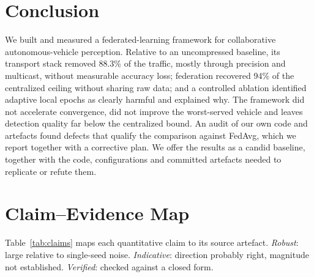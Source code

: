 \documentclass[journal]{IEEEtran}
\begin{document}
\section{Conclusion}\label{sec:conclusion}
We built and measured a federated-learning framework for collaborative autonomous-vehicle perception. Relative to an uncompressed baseline, its transport stack removed 88.3\% of the traffic, mostly through precision and multicast, without measurable accuracy loss; federation recovered 94\% of the centralized ceiling without sharing raw data; and a controlled ablation identified adaptive local epochs as clearly harmful and explained why. The framework did not accelerate convergence, did not improve the worst-served vehicle and leaves detection quality far below the centralized bound. An audit of our own code and artefacts found defects that qualify the comparison against FedAvg, which we report together with a corrective plan. We offer the results as a candid baseline, together with the code, configurations and committed artefacts needed to replicate or refute them.

\appendices

\section{Claim--Evidence Map}\label{app:claims}
Table~\ref{tab:claims} maps each quantitative claim to its source artefact. \emph{Robust}: large relative to single-seed noise. \emph{Indicative}: direction probably right, magnitude not established. \emph{Verified}: checked against a closed form.
\end{document}
